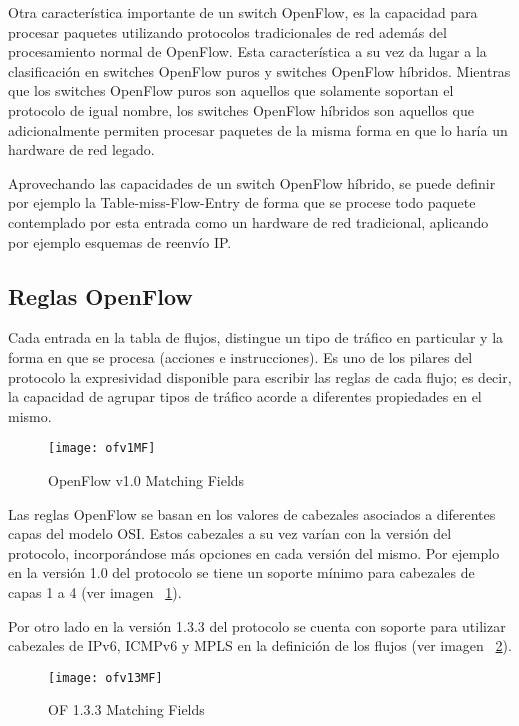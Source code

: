 Otra caracter\'istica importante de un switch OpenFlow, es la capacidad para procesar paquetes utilizando protocolos tradicionales de red adem\'as del procesamiento normal de OpenFlow. Esta característica a su vez da lugar a la clasificaci\'on en switches OpenFlow puros y switches OpenFlow h\'ibridos. Mientras que los switches OpenFlow puros son aquellos que solamente soportan el protocolo de igual nombre, los switches OpenFlow h\'ibridos son aquellos que adicionalmente permiten procesar paquetes de la misma forma en que lo har\'ia un hardware de red legado.

Aprovechando las capacidades de un switch OpenFlow h\'ibrido, se puede definir por ejemplo la Table-miss-Flow-Entry de forma que se procese todo paquete contemplado por esta entrada como un hardware de red tradicional, aplicando por ejemplo esquemas de reenvío IP. 

\subsection{Reglas OpenFlow}
Cada entrada en la tabla de flujos, distingue un tipo de tr\'afico en particular y la forma en que se procesa (acciones e instrucciones). Es uno de los pilares del protocolo la expresividad disponible para escribir las reglas de cada flujo; es decir, la capacidad de agrupar tipos de tr\'afico acorde a diferentes propiedades en el mismo.

\begin{figure}[h] 
\centering    
\texttt{[image: ofv1MF]}
\caption[OF 1.0 Matching Fields]{OpenFlow v1.0 Matching Fields}
\label{fig:OF10MatchingFields}
\end{figure}

Las reglas OpenFlow se basan en los valores de cabezales asociados a diferentes capas del modelo OSI. Estos cabezales a su vez varían con la versi\'on del protocolo, incorporándose m\'as opciones en cada versi\'on del mismo. Por ejemplo en la versi\'on 1.0 del protocolo se tiene un soporte mínimo para cabezales de capas 1 a 4 (ver imagen ~\ref{fig:OF10MatchingFields}).

Por otro lado en la versi\'on 1.3.3 del protocolo se cuenta con soporte para utilizar cabezales de IPv6, ICMPv6 y MPLS en la definición de los flujos (ver imagen ~\ref{fig:OF13MatchingFields}).
 
\begin{figure}[ht] 
\centering    
\texttt{[image: ofv13MF]}
\caption[OF 1.3.3 Matching Fields]{OF 1.3.3 Matching Fields}
\label{fig:OF13MatchingFields}
\end{figure}

